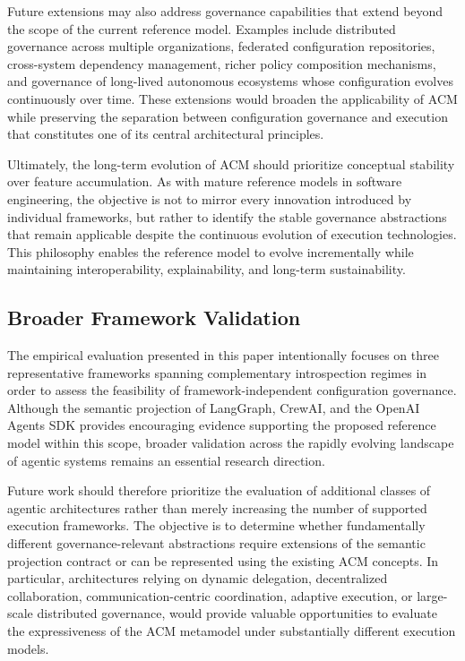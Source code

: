 \documentclass[10pt]{article}
\begin{document}
Future extensions may also address governance capabilities that extend beyond the scope of the current reference model. Examples include distributed governance across multiple organizations, federated configuration repositories, cross-system dependency management, richer policy composition mechanisms, and governance of long-lived autonomous ecosystems whose configuration evolves continuously over time. These extensions would broaden the applicability of ACM while preserving the separation between configuration governance and execution that constitutes one of its central architectural principles.

Ultimately, the long-term evolution of ACM should prioritize conceptual stability over feature accumulation. As with mature reference models in software engineering, the objective is not to mirror every innovation introduced by individual frameworks, but rather to identify the stable governance abstractions that remain applicable despite the continuous evolution of execution technologies. This philosophy enables the reference model to evolve incrementally while maintaining interoperability, explainability, and long-term sustainability.

\subsection{Broader Framework Validation}
\label{sec:future_framework_validation}

The empirical evaluation presented in this paper intentionally focuses on three representative frameworks spanning complementary introspection regimes in order to assess the feasibility of framework-independent configuration governance. Although the semantic projection of LangGraph, CrewAI, and the OpenAI Agents SDK provides encouraging evidence supporting the proposed reference model within this scope, broader validation across the rapidly evolving landscape of agentic systems remains an essential research direction.

Future work should therefore prioritize the evaluation of additional classes of agentic architectures rather than merely increasing the number of supported execution frameworks. The objective is to determine whether fundamentally different governance-relevant abstractions require extensions of the semantic projection contract or can be represented using the existing ACM concepts. In particular, architectures relying on dynamic delegation, decentralized collaboration, communication-centric coordination, adaptive execution, or large-scale distributed governance, would provide valuable opportunities to evaluate the expressiveness of the ACM metamodel under substantially different execution models.
\end{document}
